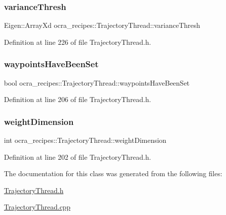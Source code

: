 \subsubsection{\texorpdfstring{variance\+Thresh}{varianceThresh}}
{\footnotesize\ttfamily Eigen\+::\+Array\+Xd ocra\+\_\+recipes\+::\+Trajectory\+Thread\+::variance\+Thresh\hspace{0.3cm}{\ttfamily [protected]}}



Definition at line 226 of file Trajectory\+Thread.\+h.

\hypertarget{classocra__recipes_1_1TrajectoryThread_a35b51009ac64e577770b0e728846c4c4}{}\label{classocra__recipes_1_1TrajectoryThread_a35b51009ac64e577770b0e728846c4c4} 
\subsubsection{\texorpdfstring{waypoints\+Have\+Been\+Set}{waypointsHaveBeenSet}}
{\footnotesize\ttfamily bool ocra\+\_\+recipes\+::\+Trajectory\+Thread\+::waypoints\+Have\+Been\+Set\hspace{0.3cm}{\ttfamily [protected]}}



Definition at line 206 of file Trajectory\+Thread.\+h.

\hypertarget{classocra__recipes_1_1TrajectoryThread_a32ee7b3f9364768200a460283f7be5ef}{}\label{classocra__recipes_1_1TrajectoryThread_a32ee7b3f9364768200a460283f7be5ef} 
\subsubsection{\texorpdfstring{weight\+Dimension}{weightDimension}}
{\footnotesize\ttfamily int ocra\+\_\+recipes\+::\+Trajectory\+Thread\+::weight\+Dimension\hspace{0.3cm}{\ttfamily [protected]}}



Definition at line 202 of file Trajectory\+Thread.\+h.



The documentation for this class was generated from the following files\+:\begin{DoxyCompactItemize}
\item 
\hyperlink{TrajectoryThread_8h}{Trajectory\+Thread.\+h}\item 
\hyperlink{TrajectoryThread_8cpp}{Trajectory\+Thread.\+cpp}\end{DoxyCompactItemize}
